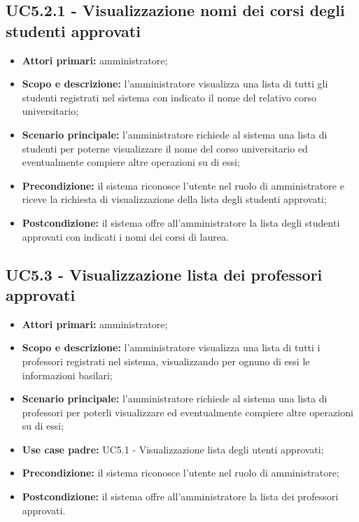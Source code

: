 \documentclass[AnalisiDeiRequisiti.tex]{subfiles}
\begin{document}
\subsection{UC5.2.1 - Visualizzazione nomi dei corsi degli studenti approvati}
\begin{itemize}
	\item \textbf{Attori primari:} amministratore;
	\item \textbf{Scopo e descrizione:} l'amministratore visualizza una lista di tutti gli studenti registrati nel sistema con indicato il nome del relativo corso universitario;
	\item \textbf{Scenario principale:} l'amministratore richiede al sistema una lista di studenti per poterne visualizzare il nome del corso universitario ed eventualmente compiere altre operazioni su di essi;
	\item \textbf{Precondizione:} il sistema riconosce l'utente nel ruolo di amministratore e riceve la richiesta di visualizzazione della lista degli studenti approvati;
	\item \textbf{Postcondizione:} il sistema offre all'amministratore la lista degli studenti approvati con indicati i nomi dei corsi di laurea.
\end{itemize}
\subsection{UC5.3 - Visualizzazione lista dei professori approvati}
\begin{itemize}
	\item \textbf{Attori primari:} amministratore;
	\item \textbf{Scopo e descrizione:} l'amministratore visualizza una lista di tutti i professori registrati nel sistema, visualizzando per ognuno di essi le informazioni basilari;
	\item \textbf{Scenario principale:} l'amministratore richiede al sistema una lista di professori per poterli visualizzare ed eventualmente compiere altre operazioni su di essi;
	\item \textbf{Use case padre:} UC5.1 - Visualizzazione lista degli utenti approvati;
	\item \textbf{Precondizione:} il sistema riconosce l'utente nel ruolo di amministratore; 
	\item \textbf{Postcondizione:} il sistema offre all'amministratore la lista dei professori approvati.
\end{itemize}
\end{document}
